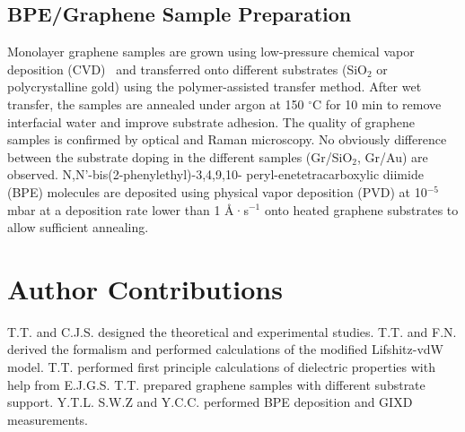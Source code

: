 \subsection*{BPE/Graphene Sample Preparation}
\label{sec:graph-sample-prep}

Monolayer graphene samples are grown using low-pressure chemical vapor
deposition (CVD)~\cite{Li_2009_science_cvd} and transferred onto
different substrates (SiO$_{2}$ or poly\-crystalline gold) using the
polymer-assisted transfer method.
%
After wet transfer, the samples are annealed under argon at 150
$^{\circ}$C for 10 min to remove interfacial water and improve substrate adhesion.
%
The quality of graphene samples is confirmed by
optical and Raman microscopy.
%
No obviously difference between the substrate doping in the different
samples (Gr/SiO$_{2}$, Gr/Au) are observed.
N,N’-bis(2-phenyl\-ethyl)-3,4,9,10- peryl-ene\-tetra\-carboxylic
diimide (BPE) molecules are deposited using physical vapor deposition
(PVD) at 10$^{-5}$ mbar at a deposition rate lower than 1 \AA·s$^{-1}$
onto heated graphene substrates to allow sufficient annealing.
%
  

\section{Author Contributions}
\label{sec:vdw-author-contributions}
T.T. and C.J.S. designed the theoretical and experimental
studies. T.T. and F.N. derived the formalism and performed
calculations of the modified Lifshitz-vdW model. T.T. performed first
principle calculations of dielectric properties with help from
E.J.G.S. T.T. prepared graphene samples with different substrate
support.  Y.T.L. S.W.Z and Y.C.C. performed BPE deposition and GIXD
measurements.











